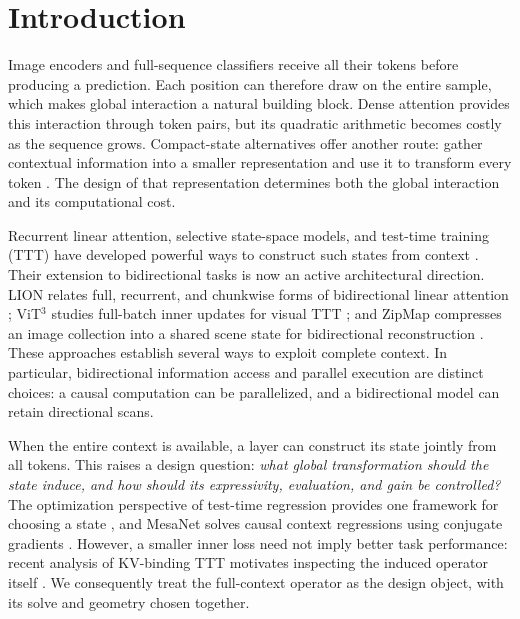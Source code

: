 \documentclass[10pt]{article}
\begin{document}
\section{Introduction}
\label{sec:introduction}

Image encoders and full-sequence classifiers receive all their tokens before
producing a prediction.  Each position can therefore draw on the entire sample,
which makes global interaction a natural building block.  Dense attention
provides this interaction through token pairs, but its quadratic arithmetic
becomes costly as the sequence grows.  Compact-state alternatives offer another
route: gather contextual information into a smaller representation and use it
to transform every token \cite{lee2019settransformer,ma2021luna,jaegle2021perceiver}.
The design of that representation determines both the global interaction and
its computational cost.

Recurrent linear attention, selective state-space models, and test-time
training (TTT) have developed powerful ways to construct such states from
context \cite{schlag2021fastweights,gu2024mamba,sun2025ttt}.
Their extension to bidirectional tasks is now an active architectural direction.
LION relates full, recurrent, and chunkwise forms of bidirectional linear
attention \cite{afzal2025lion}; ViT$^3$ studies full-batch inner updates for visual
TTT \cite{han2026vit3}; and ZipMap compresses an image collection into a shared
scene state for bidirectional reconstruction \cite{jin2026zipmap}.
These approaches establish several ways to exploit complete context.  In
particular, bidirectional information access and parallel execution are distinct
choices: a causal computation can be parallelized, and a bidirectional model
can retain directional scans.

When the entire context is available, a layer can construct its state jointly
from all tokens.  This raises a design question: \emph{what global transformation
should the state induce, and how should its expressivity, evaluation, and gain
be controlled?}  The optimization perspective of test-time regression provides
one framework for choosing a state \cite{wang2025testtimeregression}, and MesaNet
solves causal context regressions using conjugate gradients
\cite{vonoswald2026mesanet}.  However, a smaller inner loss need not imply better
task performance: recent analysis of KV-binding TTT motivates inspecting the
induced operator itself \cite{liu2026kvbinding}.  We consequently treat the
full-context operator as the design object, with its solve and geometry chosen
together.
\end{document}
